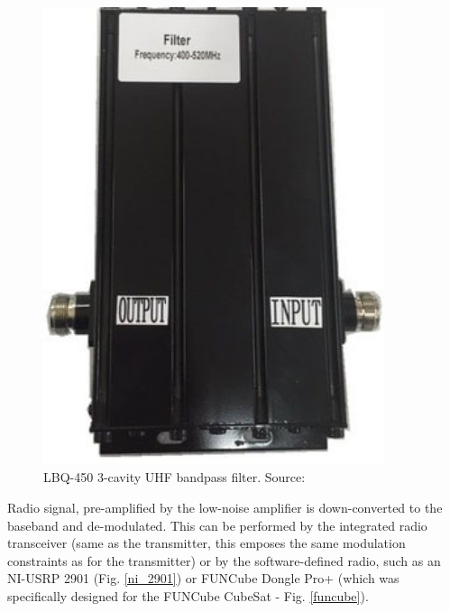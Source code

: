 \begin{minipage}{\linewidth}
\begin{minipage}{0.45\linewidth}
\begin{figure}[H]
            \includegraphics[width=10cm]{img/2/cavity_uhf.jpg}
            \caption{LBQ-450 3-cavity UHF bandpass filter. Source: \cite{cavity_uhf}}
            \label{cavity_uhf}
        \end{figure}
    \end{minipage}
\end{minipage}


Radio signal, pre-amplified by the low-noise amplifier is down-converted to the baseband and de-modulated. This can be performed by the integrated radio transceiver (same as the transmitter, this emposes the same modulation constraints as for the transmitter) or by the software-defined radio, such as an NI-USRP 2901 (Fig. \ref{ni_2901}) or FUNCube Dongle Pro+ (which was specifically designed for the FUNCube CubeSat - Fig. \ref{funcube}).

